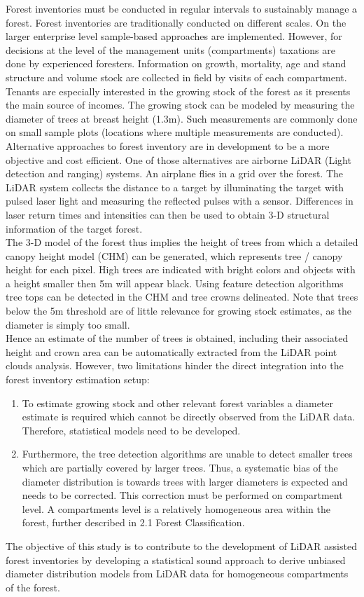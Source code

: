 
Forest inventories must be conducted in regular intervals to sustainably manage a forest. Forest inventories are
traditionally conducted on different scales. On the larger enterprise level sample-based approaches are
implemented. However, for decisions at the level of the management units (compartments) taxations are done
by experienced foresters. Information on growth, mortality, age and stand structure and volume stock are
collected in field by visits of each compartment. Tenants are especially interested in the growing stock of the
forest as it presents the main source of incomes. The growing stock can be modeled by measuring the diameter
of trees at breast height (1.3m). Such measurements are commonly done on small sample plots (locations
where multiple measurements are conducted).\\

Alternative approaches to forest inventory are in development to be a more objective and cost efficient. One of
those alternatives are airborne LiDAR (Light detection and ranging) systems. An airplane flies in a grid over the
forest. The LiDAR system collects the distance to a target by illuminating the target with pulsed laser light and
measuring the reflected pulses with a sensor. Differences in laser return times and intensities can then be used
to obtain 3-D structural information of the target forest.\\

The 3-D model of the forest thus implies the height of trees from which a detailed canopy height model (CHM)
can be generated, which represents tree / canopy height for each pixel. High trees are indicated with bright
colors and objects with a height smaller then 5m will appear black. Using feature detection algorithms tree tops
can be detected in the CHM and tree crowns delineated. Note that trees below the 5m threshold are of little
relevance for growing stock estimates, as the diameter is simply too small.\\

Hence an estimate of the number of trees is obtained, including their associated height and crown area can be automatically extracted from the LiDAR point clouds analysis. However, two limitations hinder the direct
integration into the forest inventory estimation setup:

\renewcommand{\labelenumi}{\arabic{enumi}.}
\begin{enumerate}
\item To estimate growing stock and other relevant forest variables a diameter estimate is required which
cannot be directly observed from the LiDAR data. Therefore, statistical models need to be developed.
\item Furthermore, the tree detection algorithms are unable to detect smaller trees which are partially
covered by larger trees. Thus, a systematic bias of the diameter distribution is towards trees with larger
diameters is expected and needs to be corrected.
This correction must be performed on compartment level. A compartments level is a relatively homogeneous area within the forest, further described in 2.1 Forest Classification.
\end{enumerate}

The objective of this study is to contribute to the development of LiDAR assisted forest inventories by developing a statistical sound approach to derive unbiased diameter distribution models from LiDAR data for homogeneous compartments of the forest.



